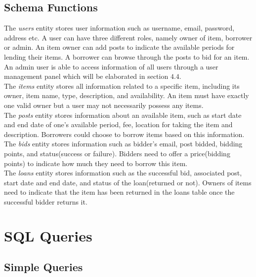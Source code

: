 \subsection{Schema Functions}
The \textit{users} entity stores user information such as username, email, password, address etc. A user can have three different roles, namely owner of item, borrower or admin. An item owner can add posts to indicate the available periods for lending their items. A borrower can browse through the posts to bid for an item. An admin user is able to access information of all users through a user management panel which will be elaborated in section $4.4$.\\
The \textit{items} entity stores all information related to a specific item, including its owner, item name, type, description, and availability. An item must have exactly one valid owner but a user may not necessarily possess any items.\\
The \textit{posts} entity stores information about an available item, such as start date and end date of one’s available period, fee, location for taking the item and description. Borrowers could choose to borrow items based on this information.\\
The \textit{bids} entity stores information such as bidder's email, post bidded, bidding points, and status(success or failure). Bidders need to offer a price(bidding points) to indicate how much they need to borrow this item.\\
The \textit{loans} entity stores information such as the successful bid, associated post, start date and end date, and status of the loan(returned or not). Owners of items need to indicate that the item has been returned in the loans table once the successful bidder returns it.

\newpage

\section{SQL Queries}

\subsection{Simple Queries}


